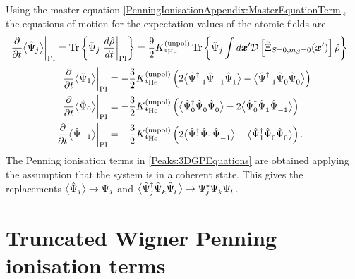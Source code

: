 Using the master equation \eqref{PenningIonisationAppendix:MasterEquationTerm}, the equations of motion for the expectation values of the atomic fields are
\begin{align}
    \left.\frac{\partial}{\partial t} {\big<\hat{\Psi}_j\big>}\right|_\text{PI} &= \operatorname{Tr}\left\{\hat{\Psi}_j \left.\frac{d\hat{\rho}}{dt}\right|_\text{PI}\right\} = \frac{9}{2} K^\text{(unpol)}_{^4\text{He}} \operatorname{Tr}\left\{\hat{\Psi}_j \int d \bm{x}' \mathcal{D}\left[\hat{\Xi}_{S=0, m_S=0}(\bm{x}')\right] \hat{\rho} \right\}
\end{align}
\begin{subequations}
    \begin{align}
        \left.\frac{\partial}{\partial t} \mean{\hat{\Psi}_1}\right|_\text{PI} &= -\frac{3}{2} \Kunpol \left(2\mean{\hat{\Psi}_{-1}^\dagger \hat{\Psi}_{-1}^{\phantom{\dagger}} \hat{\Psi}_1^{\phantom{\dagger}}} - \mean{\hat{\Psi}_{-1}^\dagger \hat{\Psi}_{0}^{\phantom{\dagger}} \hat{\Psi}_0^{\phantom{\dagger}}}\right) \\
        \left. \frac{\partial}{\partial t} \mean{\hat{\Psi}_0} \right|_\text{PI} &= -\frac{3}{2} \Kunpol \left(\mean{\hat{\Psi}_0^\dagger \hat{\Psi}_0^{\phantom{\dagger}} \hat{\Psi}_0^{\phantom{\dagger}}} -2\mean{\hat{\Psi}_0^\dagger \hat{\Psi}_1^{\phantom{\dagger}} \hat{\Psi}_{-1}^{\phantom{\dagger}}}\right)\\
        \left.\frac{\partial}{\partial t} \mean{\hat{\Psi}_{-1}}\right|_\text{PI} &= -\frac{3}{2} \Kunpol \left(2\mean{\hat{\Psi}_1^\dagger \hat{\Psi}_{1}^{\phantom{\dagger}} \hat{\Psi}_{-1}^{\phantom{\dagger}}} - \mean{\hat{\Psi}_1^\dagger \hat{\Psi}_0^{\phantom{\dagger}} \hat{\Psi}_0^{\phantom{\dagger}}}\right).
    \end{align}
    \label{PenningIonisationAppendix:GPTerms}
\end{subequations}
The Penning ionisation terms in \eqref{Peaks:3DGPEquations} are obtained applying the assumption that the system is in a coherent state. This gives the replacements ${\big<\hat{\Psi}_j\big>} \rightarrow \Psi_j$ and ${\big<\hat{\Psi}_j^\dagger \hat{\Psi}_k^{\phantom{\dagger}} \hat{\Psi}_l^{\phantom{\dagger}}\big>}\rightarrow \Psi_j^* \Psi_k^{\phantom{*}} \Psi_l^{\phantom{*}}$.

\section{Truncated Wigner Penning ionisation terms}
\label{PenningIonisationAppendix:TW}

